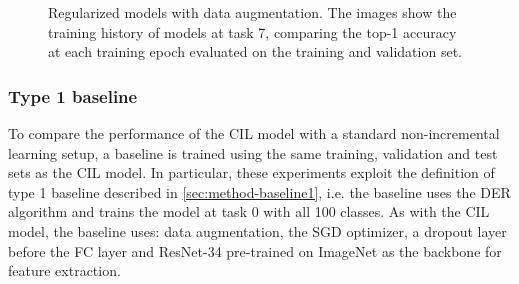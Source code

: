 \begin{figure}[H]
	\centering
    \qquad
	\caption{Regularized models with data augmentation. The images show the training history of models at task 7, comparing the top-1 accuracy at each training epoch evaluated on the training and validation set.}
	\label{fig:exp2-train_val}%
\end{figure}

\newpage
\subsubsection{Type 1 baseline}
To compare the performance of the CIL model with a standard non-incremental learning setup, a baseline is trained using the same training, validation and test sets as the CIL model.
In particular, these experiments exploit the definition of type 1 baseline described in \autoref{sec:method-baseline1}, i.e. the baseline uses the DER algorithm and trains the model at task 0 with all 100 classes.
As with the CIL model, the baseline uses: data augmentation, the SGD optimizer, a dropout layer before the FC layer and ResNet-34 pre-trained on ImageNet as the backbone for feature extraction.

